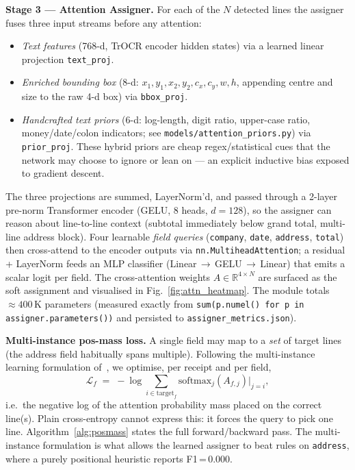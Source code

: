 \documentclass[conference]{IEEEtran}
\begin{document}
\textbf{Stage 3 --- Attention Assigner.}
For each of the $N$ detected lines the assigner fuses three input
streams before any attention:
\begin{itemize}
\item \emph{Text features} (768-d, TrOCR encoder hidden states) via a
      learned linear projection \texttt{text\_proj}.
\item \emph{Enriched bounding box} (8-d: $x_1,y_1,x_2,y_2,c_x,c_y,w,h$,
      appending centre and size to the raw 4-d box) via \texttt{bbox\_proj}.
\item \emph{Handcrafted text priors} (6-d: log-length, digit ratio,
      upper-case ratio, money/date/colon indicators; see
      \texttt{models/attention\_priors.py}) via \texttt{prior\_proj}.
      These hybrid priors are cheap regex/statistical cues that the
      network may choose to ignore or lean on --- an explicit inductive
      bias exposed to gradient descent.
\end{itemize}
The three projections are summed, LayerNorm'd, and passed through a
2-layer pre-norm Transformer encoder (GELU, 8 heads, $d{=}128$), so the
assigner can reason about line-to-line context (subtotal immediately
below grand total, multi-line address block).  Four learnable
\emph{field queries} (\texttt{company}, \texttt{date}, \texttt{address},
\texttt{total}) then cross-attend to the encoder outputs via
\texttt{nn.MultiheadAttention}; a residual + LayerNorm feeds an MLP
classifier (Linear\,$\to$\,GELU\,$\to$\,Linear) that emits a scalar
logit per field.  The cross-attention weights
$A \in \mathbb{R}^{4\times N}$ are surfaced as the soft assignment and
visualised in Fig.~\ref{fig:attn_heatmap}.
The module totals $\approx400\,$K parameters
(measured exactly from \texttt{sum(p.numel() for p in assigner.parameters())}
and persisted to \texttt{assigner\_metrics.json}).

\textbf{Multi-instance pos-mass loss.}
A single field may map to a \emph{set} of target lines (the address
field habitually spans multiple).  Following the multi-instance
learning formulation of~\cite{dietterich1997mil,ilse2018mil}, we
optimise, per receipt and per field,
\[
  \mathcal{L}_f \;=\; -\log \sum_{i \in \mathrm{target}_f}
                   \mathrm{softmax}_j(A_{f,j})\big|_{j=i},
\]
i.e.\ the negative log of the attention probability mass placed on
the correct line(s).  Plain cross-entropy cannot express this: it
forces the query to pick one line.  Algorithm~\ref{alg:posmass}
states the full forward/backward pass.  The multi-instance
formulation is what allows the learned assigner to beat rules on
\texttt{address}, where a purely positional heuristic reports
F1\,=\,0.000.
\end{document}
